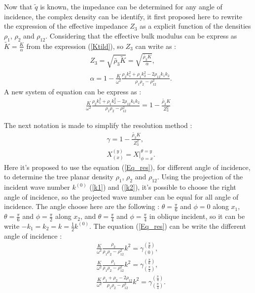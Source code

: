 \documentclass{article}
\begin{document}
    Now that $\tilde{q}$ is known, the impedance can be determined for any angle of incidence, the complex density can be identify, it first proposed here to rewrite the expression of the effective impedance $Z_3$ as a explicit function of the densities $\rho_1$, $\rho_2$ and $\rho_{12}$. Considering that the effective bulk modulus can be express as $\tilde{K}=\frac{K}{\alpha}$ from the expression (\ref{Ktild}), so $Z_3$ can write as :
    \begin{align}
        &Z_3=\sqrt{\tilde{\rho_3}\tilde{K}}=\sqrt{\frac{\tilde{\rho_3}K}{\alpha}},\\
        &\alpha=1-\frac{K}{\omega^2}\frac{\rho_2 k_1^2+\rho_1 k_2^2-2\rho_{12}k_1k_2}{\rho_1\rho_2-\rho_{12}^2}.
    \end{align}
    A new system of equation can be express as :
    \begin{align}
        \frac{K}{\omega^2}\frac{\rho_2k_1^2 +\rho_1k_2^2-2\rho_{12}k_1k_2}{\rho_1\rho_2-\rho_{12}^2}=1-\frac{\tilde{\rho_3}K}{Z_3^2}\label{Eq_res}
    \end{align}
    
    The next notation is made to simplify the resolution method :
    \begin{align}
        &\gamma=1-\frac{\tilde{\rho_3}K}{Z_3^2},\\
        &X_{(x)}^{(y)}=X|^{\theta=y}_{\phi=x}.
    \end{align}
    Here it's proposed to use the equation (\ref{Eq_res}), for different angle of incidence, to determine the tree planar density $\rho_1$, $\rho_2$ and $\rho_{12}$. Using the projection of the incident wave number $k^{(0)}$ (\ref{k1}) and (\ref{k2}), it's possible to choose the right angle of incidence, so the projected wave number can be equal for all angle of incidence. The angle choose here are the following : $\theta=\frac{\pi}{6}$ and $\phi=0$ along $x_1$, $\theta=\frac{\pi}{6}$ and $\phi=\frac{\pi}{2}$ along $x_2$, and $\theta=\frac{\pi}{4}$ and $\phi=\frac{\pi}{4}$ in oblique incident, so it can be write $-k_1=k_2=k=\frac{1}{2}k^{(0)}$.
    The equation (\ref{Eq_res}) can be write the different angle of incidence :
        \begin{align}
    &\frac{K}{\omega^2}\frac{\rho_2}{\rho_1\rho_2-\rho_{12}^2}k^2=\gamma^{(\frac{\pi}{6})}_{(0)}\label{Comp_1},\\ &\frac{K}{\omega^2}\frac{\rho_1}{\rho_1\rho_2-\rho_{12}^2}k^2=\gamma^{(\frac{\pi}{6})}_{(\frac{\pi}{2})}\label{Comp_2},\\ &\frac{K}{\omega^2}\frac{\rho_1+\rho_2-2\rho_{12}}{\rho_1\rho_2-\rho_{12}^2}k^2=\gamma^{(\frac{\pi}{4})}_{(\frac{\pi}{4})}\label{Comp_3}.
    \end{align}
    
\end{document}
